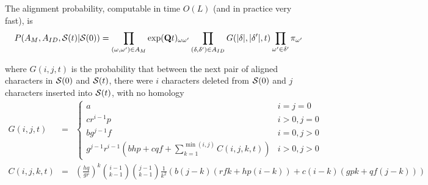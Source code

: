\documentclass{article}
\begin{document}
The alignment probability, computable in time $O(L)$ (and in practice very fast), is
\[
P(A_M,A_{ID},{\cal S}(t)|{\cal S}(0)) =
\prod_{(\omega,\omega') \in A_M} \exp({\bf Q}t)_{\omega \omega'}
\prod_{(\delta,\delta') \in A_{ID}} G(|\delta|,|\delta'|,t)
\prod_{\omega'\in \delta'} \pi_{\omega'}
\]

where $G(i,j,t)$ is the probability that between the next pair of aligned characters in ${\cal S}(0)$ and ${\cal S}(t)$,
there were $i$ characters deleted from ${\cal S}(0)$ 
and $j$ characters inserted into ${\cal S}(t)$,
with no homology
\begin{eqnarray*}
G(i,j,t) & = &
\left\{ \begin{array}{ll}
a & i=j=0 \\
cr^{i-1}p & i>0, j=0 \\
bg^{j-1}f & i=0, j>0 \\
\displaystyle
g^{j-1} r^{i-1}
\left(
bhp + cqf +
\sum_{k=1}^{\min(i,j)} C(i,j,k,t)
\right)
& i>0, j>0
\end{array} \right.
\\
C(i,j,k,t) & = &
\left( \frac{hq}{gr} \right)^k
\binom{i-1}{k-1} \binom{j-1}{k-1} \frac{1}{k^2}
\left( b(j-k)(rfk + hp(i-k)) + c(i-k)(gpk + qf(j-k)) \right)
\end{eqnarray*}


% 
% 
% 
\end{document}

